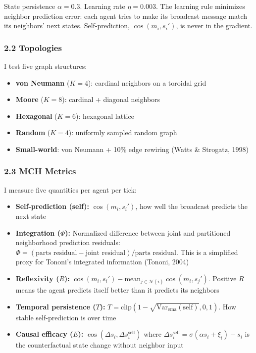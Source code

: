 \documentclass[
  11pt,
]{article}
\providecommand{\tightlist}{%
  \setlength{\itemsep}{0pt}\setlength{\parskip}{0pt}}
\begin{document}
State persistence \(\alpha = 0.3\). Learning rate \(\eta = 0.003\). The
learning rule minimizes neighbor prediction error: each agent tries to
make its broadcast message match its neighbors' next states.
Self-prediction, \(\cos(m_i, s_i')\), is never in the gradient.

\subsubsection{2.2 Topologies}\label{topologies}

I test five graph structures:

\begin{itemize}
\tightlist
\item
  \textbf{von Neumann} (\(K = 4\)): cardinal neighbors on a toroidal
  grid
\item
  \textbf{Moore} (\(K = 8\)): cardinal + diagonal neighbors
\item
  \textbf{Hexagonal} (\(K = 6\)): hexagonal lattice
\item
  \textbf{Random} (\(K = 4\)): uniformly sampled random graph
\item
  \textbf{Small-world}: von Neumann + 10\% edge rewiring (Watts \&
  Strogatz, 1998)
\end{itemize}

\subsubsection{2.3 MCH Metrics}\label{mch-metrics}

I measure five quantities per agent per tick:

\begin{itemize}
\tightlist
\item
  \textbf{Self-prediction (self):} \(\cos(m_i, s_i')\), how well the
  broadcast predicts the next state
\item
  \textbf{Integration (\(\Phi\)):} Normalized difference between joint
  and partitioned neighborhood prediction residuals:
  \(\Phi = (\text{parts residual} - \text{joint residual}) / \text{parts residual}\).
  This is a simplified proxy for Tononi's integrated information
  (Tononi, 2004)
\item
  \textbf{Reflexivity (\(R\)):}
  \(\cos(m_i, s_i') - \text{mean}_{j \in \mathcal{N}(i)} \cos(m_i, s_j')\).
  Positive \(R\) means the agent predicts itself better than it predicts
  its neighbors
\item
  \textbf{Temporal persistence (\(T\)):}
  \(T = \text{clip}(1 - \sqrt{\text{Var}_{\text{ema}}(\text{self})}, 0, 1)\).
  How stable self-prediction is over time
\item
  \textbf{Causal efficacy (\(E\)):}
  \(\cos(\Delta s_i, \Delta s_i^{\text{self}})\) where
  \(\Delta s_i^{\text{self}} = \sigma(\alpha s_i + \xi_i) - s_i\) is the
  counterfactual state change without neighbor input
\end{itemize}
\end{document}
